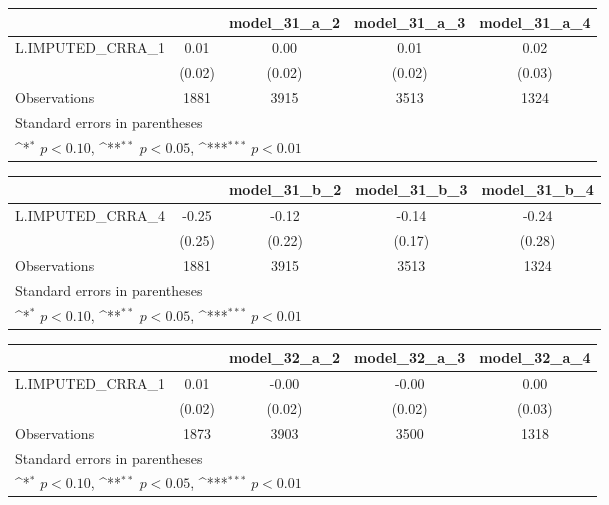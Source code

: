{
\def\sym#1{\ifmmode^{#1}\else\(^{#1}\)\fi}
\begin{tabular}{l*{4}{c}}
\toprule
                &\multicolumn{1}{c}{}&\multicolumn{1}{c}{model\_31\_a\_2}&\multicolumn{1}{c}{model\_31\_a\_3}&\multicolumn{1}{c}{model\_31\_a\_4}\\
\midrule
L.IMPUTED\_CRRA\_1&     0.01         &     0.00         &     0.01         &     0.02         \\
                &   (0.02)         &   (0.02)         &   (0.02)         &   (0.03)         \\
\midrule
Observations    &     1881         &     3915         &     3513         &     1324         \\
\bottomrule
\multicolumn{5}{l}{\footnotesize Standard errors in parentheses}\\
\multicolumn{5}{l}{\footnotesize \sym{*} \(p<0.10\), \sym{**} \(p<0.05\), \sym{***} \(p<0.01\)}\\
\end{tabular}
}
{
\def\sym#1{\ifmmode^{#1}\else\(^{#1}\)\fi}
\begin{tabular}{l*{4}{c}}
\toprule
                &\multicolumn{1}{c}{}&\multicolumn{1}{c}{model\_31\_b\_2}&\multicolumn{1}{c}{model\_31\_b\_3}&\multicolumn{1}{c}{model\_31\_b\_4}\\
\midrule
L.IMPUTED\_CRRA\_4&    -0.25         &    -0.12         &    -0.14         &    -0.24         \\
                &   (0.25)         &   (0.22)         &   (0.17)         &   (0.28)         \\
\midrule
Observations    &     1881         &     3915         &     3513         &     1324         \\
\bottomrule
\multicolumn{5}{l}{\footnotesize Standard errors in parentheses}\\
\multicolumn{5}{l}{\footnotesize \sym{*} \(p<0.10\), \sym{**} \(p<0.05\), \sym{***} \(p<0.01\)}\\
\end{tabular}
}
{
\def\sym#1{\ifmmode^{#1}\else\(^{#1}\)\fi}
\begin{tabular}{l*{4}{c}}
\toprule
                &\multicolumn{1}{c}{}&\multicolumn{1}{c}{model\_32\_a\_2}&\multicolumn{1}{c}{model\_32\_a\_3}&\multicolumn{1}{c}{model\_32\_a\_4}\\
\midrule
L.IMPUTED\_CRRA\_1&     0.01         &    -0.00         &    -0.00         &     0.00         \\
                &   (0.02)         &   (0.02)         &   (0.02)         &   (0.03)         \\
\midrule
Observations    &     1873         &     3903         &     3500         &     1318         \\
\bottomrule
\multicolumn{5}{l}{\footnotesize Standard errors in parentheses}\\
\multicolumn{5}{l}{\footnotesize \sym{*} \(p<0.10\), \sym{**} \(p<0.05\), \sym{***} \(p<0.01\)}\\
\end{tabular}
}
